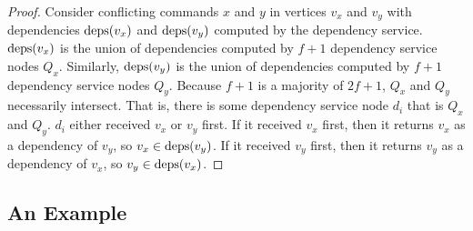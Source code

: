 \begin{proof}
  Consider conflicting commands $x$ and $y$ in vertices $v_x$ and $v_y$ with
  dependencies $\text{deps}(v_x)$ and $\text{deps}(v_y)$ computed by the dependency
  service. $\text{deps}(v_x)$ is the union of dependencies computed by $f+1$
  dependency service nodes $Q_x$. Similarly, $\text{deps}(v_y)$ is the union of
  dependencies computed by $f+1$ dependency service nodes $Q_y$. Because $f+1$
  is a majority of $2f+1$, $Q_x$ and $Q_y$ necessarily intersect. That is,
  there is some dependency service node $d_i$ that is $Q_x$ and $Q_y$.  $d_i$
  either received $v_x$ or $v_y$ first.  If it received $v_x$ first, then it
  returns $v_x$ as a dependency of $v_y$, so $v_x \in \text{deps}(v_y)$.  If it
  received $v_y$ first, then it returns $v_y$ as a dependency of $v_x$, so $v_y
  \in \text{deps}(v_x)$.
\end{proof}


\subsection{An Example}


